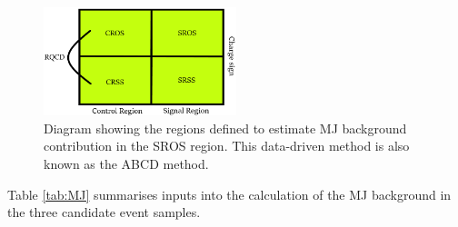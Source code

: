 \begin{figure}[htbp]
	\centering
	\includegraphics[width=0.5\textwidth]{figures/Fig7.png}
	\caption{Diagram showing the regions defined to estimate MJ background contribution in the SROS region. This data-driven method is also known as the ABCD method.}
	\label{Fig7}
\end{figure}
Table \ref{tab:MJ} summarises inputs into the calculation of the MJ background in the three candidate event samples. 
